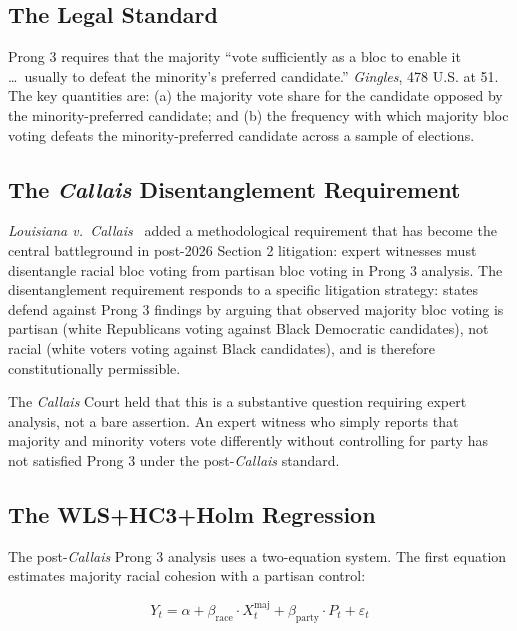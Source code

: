 \label{sec:prong3}

\subsection{The Legal Standard}

Prong 3 requires that the majority ``vote sufficiently as a bloc to enable it
\ldots\ usually to defeat the minority's preferred candidate.''  \textit{Gingles},
478 U.S. at 51.  The key quantities are: (a) the majority vote share for the
candidate opposed by the minority-preferred candidate; and (b) the frequency
with which majority bloc voting defeats the minority-preferred candidate
across a sample of elections.

\subsection{The \textit{Callais} Disentanglement Requirement}

\textit{Louisiana v.\ Callais}~\citep{callais2026} added a methodological
requirement that has become the central battleground in post-2026 Section 2
litigation: expert witnesses must disentangle racial bloc voting from partisan
bloc voting in Prong 3 analysis.  The disentanglement requirement responds
to a specific litigation strategy: states defend against Prong 3 findings by
arguing that observed majority bloc voting is partisan (white Republicans
voting against Black Democratic candidates), not racial (white voters voting
against Black candidates), and is therefore constitutionally permissible.

The \textit{Callais} Court held that this is a substantive question requiring
expert analysis, not a bare assertion.  An expert witness who simply reports
that majority and minority voters vote differently without controlling for
party has not satisfied Prong 3 under the post-\textit{Callais} standard.

\subsection{The WLS+HC3+Holm Regression}

The post-\textit{Callais} Prong 3 analysis uses a two-equation system.
The first equation estimates majority racial cohesion with a partisan control:

\begin{equation}
  Y_t = \alpha + \beta_{\text{race}} \cdot X^{\text{maj}}_t
                + \beta_{\text{party}} \cdot P_t
                + \varepsilon_t
  \label{eq:prong3-main}
\end{equation}


